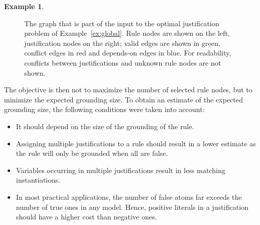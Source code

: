 \documentclass[11pt]{article}
\theoremstyle{plain}
\theoremstyle{definition}
\theoremstyle{example_basic}
\newtheorem{example}[thm]{Example}
\theoremstyle{example_contd}
\theoremstyle{plain}
\begin{document}
\begin{example}
\begin{figure}
\caption{The graph that is part of the input to the optimal justification problem of Example~\ref{ex:global}. Rule nodes are shown on the left, justification nodes on the right; valid edges are shown in green, conflict edges in red and depends-on edges in blue. For readability, conflicts between justifications and unknown rule nodes are not shown.}
\label{fig:ocs}
\end{figure}

\end{example}

The objective is then not to maximize the number of selected rule nodes, but to minimize the expected grounding size. To obtain an estimate of the expected grounding size, the following conditions were taken into account:
\begin{itemize}
  \item It should depend on the size of the grounding of the rule.
  \item Assigning multiple justifications to a rule should result in
  a lower estimate as the rule will only be grounded when all are false.
  \item Variables occurring in multiple justifications result in less matching instantiations.
  \item In most practical applications, the number of false atoms far exceeds the number of true ones in any model. Hence, positive literals in a justification should have a higher cost than negative ones. 
\end{itemize}
\end{document}
